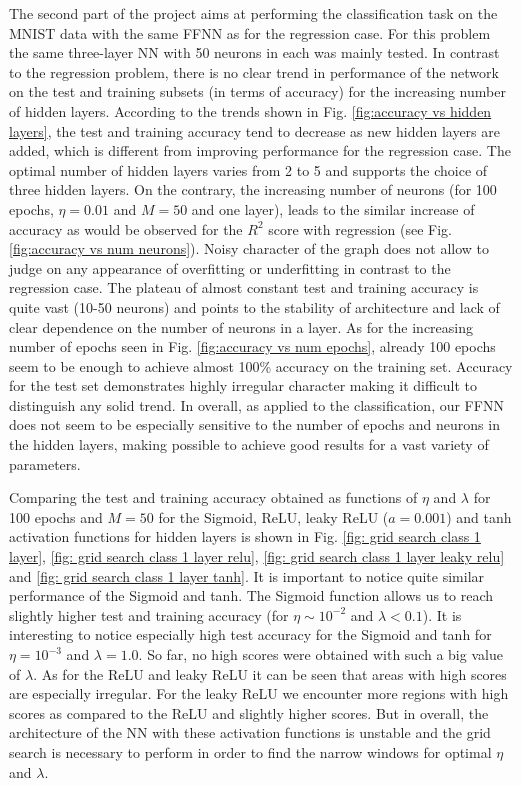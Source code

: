 \documentclass{emulateapj}
\begin{document}
The second part of the project aims at performing the classification task on the MNIST data with the same FFNN as for the regression case. For this problem the same three-layer NN with 50 neurons in each was mainly tested. In contrast to the regression problem, there is no clear trend in performance of the network on the test and training subsets (in terms of accuracy) for the increasing number of hidden layers. According to the trends shown in Fig. \ref{fig:accuracy vs hidden layers}, the test and training accuracy tend to decrease as new hidden layers are added, which is different from improving performance for the regression case. The optimal number of hidden layers varies from 2 to 5 and supports the choice of three hidden layers. On the contrary, the increasing number of neurons (for 100 epochs, $\eta=0.01$ and $M=50$ and one layer), leads to the similar increase of accuracy as would be observed for the $R^2$ score with regression (see Fig. \ref{fig:accuracy vs num neurons}). Noisy character of the graph does not allow to judge on any appearance of overfitting or underfitting in contrast to the regression case. The plateau of almost constant test and training accuracy is quite vast (10-50 neurons) and points to the stability of architecture and lack of clear dependence on the number of neurons in a layer. As for the increasing number of epochs seen in Fig. \ref{fig:accuracy vs num epochs}, already 100 epochs seem to be enough to achieve almost 100\% accuracy on the training set. Accuracy for the test set demonstrates highly irregular character making it difficult to distinguish any solid trend. In overall, as applied to the classification, our FFNN does not seem to be especially sensitive to the number of epochs and neurons in the hidden layers, making possible to achieve good results for a vast variety of parameters.


Comparing the test and training accuracy obtained as functions of $\eta$ and $\lambda$ for 100 epochs and $M=50$ for the Sigmoid, ReLU, leaky ReLU ($a=0.001$) and tanh activation functions for hidden layers is shown in Fig. \ref{fig: grid search class 1 layer}, \ref{fig: grid search class 1 layer relu}, \ref{fig: grid search class 1 layer leaky relu} and \ref{fig: grid search class 1 layer tanh}. It is important to notice quite similar performance of the Sigmoid and tanh. The Sigmoid function allows us to reach slightly higher test and training accuracy (for $\eta\sim10^{-2}$ and $\lambda<0.1$). It is interesting to notice especially high test accuracy for the Sigmoid and tanh for $\eta=10^{-3}$ and $\lambda=1.0$. So far, no high scores were obtained with such a big value of $\lambda$.  As for the ReLU and leaky ReLU it can be seen that areas with high scores are especially irregular. For the leaky ReLU we encounter more regions with high scores as compared to the ReLU and slightly higher scores. But in overall, the architecture of the NN with these activation functions is unstable and the grid search is necessary to perform in order to find the narrow windows for optimal $\eta$ and $\lambda$. 
\end{document}
